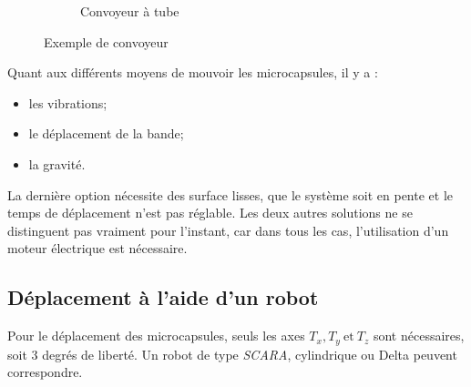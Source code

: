 \begin{figure}[h!]
\begin{subfigure}{0.45\textwidth}
        \caption{Convoyeur à tube\footnotemark}
        \label{img:convoyeur_tube}
    \end{subfigure}
    \caption{Exemple de convoyeur}
\end{figure}
Quant aux différents moyens de mouvoir les \glspl{microcapsule}, il y a : 
\begin{itemize}
    \item les vibrations;
    \item le déplacement de la bande;
    \item la gravité.
\end{itemize}

La dernière option nécessite des surface lisses, que le système soit en pente et le temps de déplacement n'est pas réglable. Les deux autres solutions ne se distinguent pas vraiment pour l'instant, car dans tous les cas, l'utilisation d'un moteur électrique est nécessaire.

\subsection*{Déplacement à l'aide d'un robot}
Pour le déplacement des \glspl{microcapsule}, seuls les axes $T_x, T_y~\text{et}~T_z$ sont nécessaires, soit $3$ degrés de liberté. Un robot de type \textit{SCARA}, cylindrique ou Delta peuvent correspondre.

